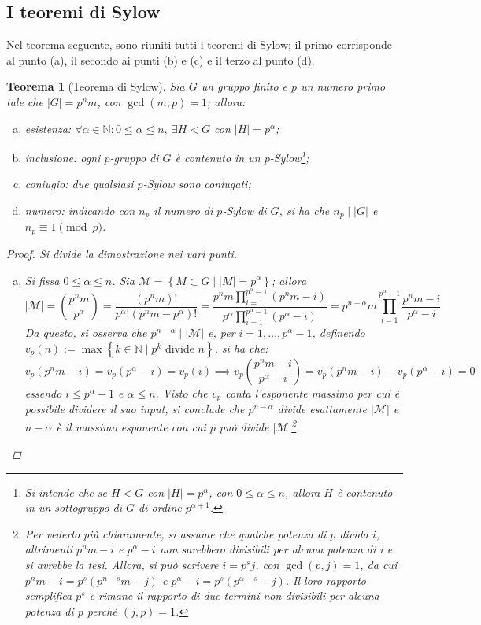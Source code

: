 \documentclass[12pt]{scrartcl}
\theoremstyle{style}
\newtheorem{teorema}{Teorema}[section]
\numberwithin{equation}{subsection}
\begin{document}
\subsection{I teoremi di Sylow}
Nel teorema seguente, sono riuniti tutti i teoremi di Sylow; il primo corrisponde al punto (a), il secondo ai punti (b) e (c) e il terzo al punto (d).
\begin{teorema}
	[Teorema di Sylow]
	Sia $G$ un gruppo finito e $p$ un numero primo tale che $\lvert G \rvert =p^n m$, con $\operatorname{gcd}(m,p) =1$; allora:
	\begin{enumerate}[(a).]
		\item \textit{esistenza}: $\forall \alpha \in \mathbb{N} : 0\le \alpha \le n, \ \exists H < G$ con $\lvert H \rvert = p^\alpha $;
		\item \textit{inclusione}: ogni $p$-gruppo di $G$ \`e contenuto in un $p$-Sylow\footnote{Si intende che se $H < G$ con $\lvert H \rvert = p^\alpha $, con $0\le \alpha\le n $, allora $H$ \`e contenuto in un sottogruppo di $G$ di ordine $p^{\alpha  + 1} $.};
		\item \textit{coniugio}: due qualsiasi $p$-Sylow sono coniugati;
		\item \textit{numero}: indicando con $n_p$ il numero di $p$-Sylow di $G$, si ha che $n_p  \mid |G|$ e $n_p \equiv 1 \pmod{p} $.
	\end{enumerate}
	\begin{proof}
		Si divide la dimostrazione nei vari punti.
		\begin{enumerate}[(a).]
			\item Si fissa $0\le \alpha \le n$. 
				Sia $\mathcal{M} = \left\{ M \subset G  \mid \lvert M \rvert = p^\alpha  \right\} $; allora 
				\[
						\lvert \mathcal{M}  \rvert =\binom{p^n m}{p^\alpha } = \frac{(p^nm)!}{p^\alpha ! (p^nm-p^\alpha )!} = \frac{\displaystyle p^n m \prod_{i=1} ^{p^{\alpha }-1 } (p^n m - i)}{p^\alpha \displaystyle \prod_{i=1} ^{p^{\alpha }-1 } (p^{\alpha }-i) } = p^{n-\alpha } m \prod_{i=1} ^{p^{\alpha }-1 } \frac{p^n m - i}{p^\alpha  -i}
				\] 
				Da questo, si osserva che $p^{n-\alpha }  \mid  |\mathcal{M} |$ e, per $i=1,\ldots,p^{\alpha }-1 $, definendo $v_p(n):=\max \left\{ k \in \mathbb{N}  \mid p^k \text{ divide } n \right\} $, si ha che:
				\[
				v_p(p^nm - i) = v_p(p^\alpha -i)=v_p(i)\implies v_p\left(\frac{p^nm - i}{p^{\alpha } -i}\right) =v_p(p^nm-i) - v_p(p^\alpha  - i) = 0
				\] 
				essendo $i\le p^{\alpha }-1 $ e $\alpha \le n$. Visto che $v_p$ conta l'esponente massimo per cui \`e possibile dividere il suo input, si conclude che $p^{n-\alpha } $ divide esattamente $\lvert \mathcal{M}  \rvert $ e $n-\alpha $ \`e il massimo esponente con cui $p$ pu\`o divide $\lvert \mathcal{M}  \rvert $\footnote{Per vederlo pi\`u chiaramente, si assume che qualche potenza di $p$ divida $i$, altrimenti $p^nm - i$ e $p^\alpha - i$ non sarebbero divisibili per alcuna potenza di i e si avrebbe la tesi. Allora, si pu\`o scrivere $i = p^s j$, con $\operatorname{gcd}(p,j) =1$, da cui $p^{n} m - i = p^s(p^{n-s} m - j)$ e $p^\alpha - i = p^s (p^{\alpha - s} - j)$. Il loro rapporto semplifica $p^s$ e rimane il rapporto di due termini non divisibili per alcuna potenza di $p$ perch\'e $(j,p) = 1$.}.


\end{enumerate}
\end{proof}
\end{teorema}
\end{document}
